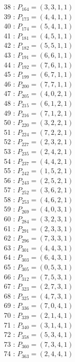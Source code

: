 \documentclass{article}
\begin{document}
{\begin{multicols}{3}
38 : $P_{164}=( 3, 3, 1, 1 )$\\
39 : $P_{173}=( 4, 4, 1, 1 )$\\
40 : $P_{174}=( 5, 4, 1, 1 )$\\
41 : $P_{181}=( 4, 5, 1, 1 )$\\
42 : $P_{182}=( 5, 5, 1, 1 )$\\
43 : $P_{191}=( 6, 6, 1, 1 )$\\
44 : $P_{192}=( 7, 6, 1, 1 )$\\
45 : $P_{199}=( 6, 7, 1, 1 )$\\
46 : $P_{200}=( 7, 7, 1, 1 )$\\
47 : $P_{205}=( 4, 0, 2, 1 )$\\
48 : $P_{215}=( 6, 1, 2, 1 )$\\
49 : $P_{216}=( 7, 1, 2, 1 )$\\
50 : $P_{220}=( 3, 2, 2, 1 )$\\
51 : $P_{224}=( 7, 2, 2, 1 )$\\
52 : $P_{227}=( 2, 3, 2, 1 )$\\
53 : $P_{235}=( 2, 4, 2, 1 )$\\
54 : $P_{237}=( 4, 4, 2, 1 )$\\
55 : $P_{242}=( 1, 5, 2, 1 )$\\
56 : $P_{243}=( 2, 5, 2, 1 )$\\
57 : $P_{252}=( 3, 6, 2, 1 )$\\
58 : $P_{253}=( 4, 6, 2, 1 )$\\
59 : $P_{269}=( 4, 0, 3, 1 )$\\
60 : $P_{284}=( 3, 2, 3, 1 )$\\
61 : $P_{291}=( 2, 3, 3, 1 )$\\
62 : $P_{296}=( 7, 3, 3, 1 )$\\
63 : $P_{301}=( 4, 4, 3, 1 )$\\
64 : $P_{303}=( 6, 4, 3, 1 )$\\
65 : $P_{305}=( 0, 5, 3, 1 )$\\
66 : $P_{312}=( 7, 5, 3, 1 )$\\
67 : $P_{323}=( 2, 7, 3, 1 )$\\
68 : $P_{325}=( 4, 7, 3, 1 )$\\
69 : $P_{336}=( 7, 0, 4, 1 )$\\
70 : $P_{339}=( 2, 1, 4, 1 )$\\
71 : $P_{340}=( 3, 1, 4, 1 )$\\
72 : $P_{358}=( 5, 3, 4, 1 )$\\
73 : $P_{360}=( 7, 3, 4, 1 )$\\
74 : $P_{363}=( 2, 4, 4, 1 )$\\

\end{multicols}}
\end{document}
